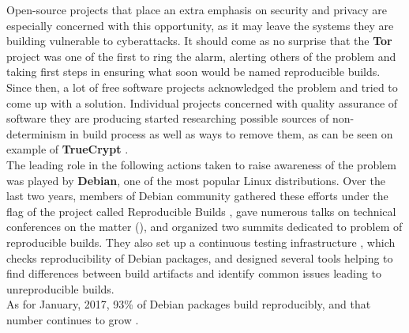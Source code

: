 {Open-source projects that place an extra emphasis on security
and privacy are especially concerned with this opportunity, as
it may leave the systems they are building vulnerable to cyberattacks.
It should come as no surprise that the \textbf{Tor} project was one of the
first to ring the alarm, alerting others of the problem and taking first steps
in ensuring what soon would be named reproducible builds\cite{tor13, tor14}.\\
Since then, a lot of free software projects acknowledged the problem and
tried to come up with a solution. Individual projects concerned with quality
assurance of software they are producing started researching possible sources of
non-determinism in build process as well as ways to remove them, as can be
seen on example of \textbf{TrueCrypt} \cite{de2014challenges}.\\
The leading role in the following actions taken to raise awareness of the
problem was played by \textbf{Debian}, one of the most popular Linux distributions.
Over the last two years, members of Debian community gathered these efforts
under the flag of the project called Reproducible Builds \cite{Rb},
gave numerous talks on technical conferences on the matter
(\citep{Lun14, MiniDebConfCambridge2016, lca2017_valerie}), and organized
two summits dedicated to problem of reproducible builds. They also set up a continuous
testing infrastructure \cite{tests-rbo}, which checks reproducibility
of Debian packages, and designed several tools helping to find
differences between build artifacts and identify common issues leading to
unreproducible builds. \\
As for January, 2017, 93\% of Debian packages
build reproducibly, and that number continues to grow \cite{tests-rbo}.\\}
